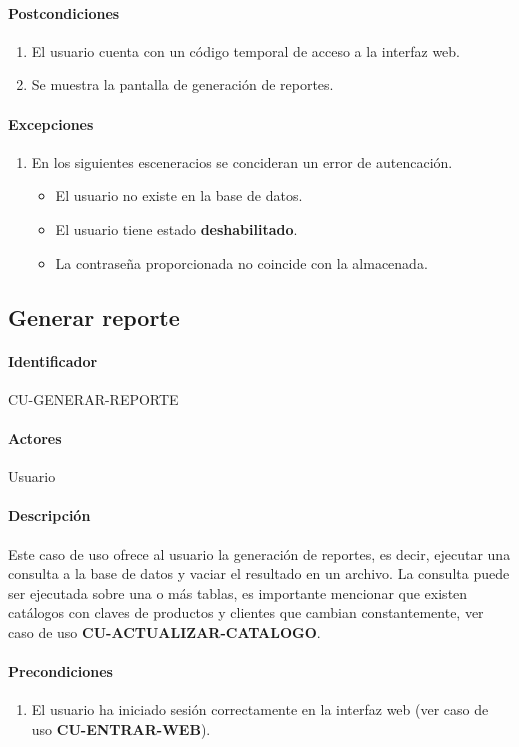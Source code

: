 \paragraph{Postcondiciones}
\begin{enumerate}
  \item El usuario cuenta con un código temporal de acceso a la interfaz web.
  \item Se muestra la pantalla de generación de reportes.
\end{enumerate}
\paragraph{Excepciones}
\begin{enumerate}
  \item En los siguientes esceneracios se concideran un error de autencación.
  \begin{itemize}
    \item El usuario no existe en la base de datos.
    \item El usuario tiene estado \textbf{deshabilitado}.
    \item La contraseña proporcionada no coincide con la almacenada. 
  \end{itemize}
\end{enumerate}

\subsection{Generar reporte}
\paragraph{Identificador}
CU-GENERAR-REPORTE
\paragraph{Actores}
Usuario
\paragraph{Descripción}
Este caso de uso ofrece al usuario la generación de reportes, es decir, ejecutar una consulta a la base de datos y vaciar el resultado en un archivo. La consulta puede ser ejecutada sobre una o más tablas, es importante mencionar que existen catálogos con claves de productos y clientes que cambian constantemente, ver caso de uso \textbf{CU-ACTUALIZAR-CATALOGO}.
\paragraph{Precondiciones}
\begin{enumerate}
  \item El usuario ha iniciado sesión correctamente en la interfaz web (ver caso de uso \textbf{CU-ENTRAR-WEB}).
\end{enumerate}
